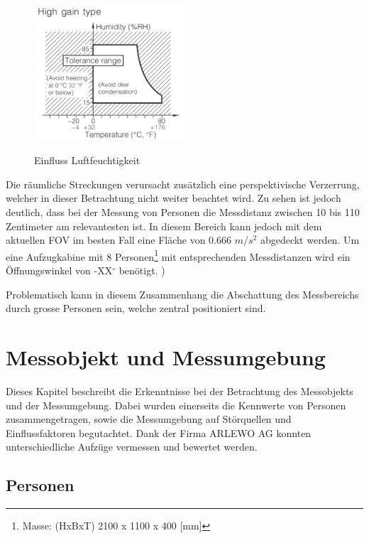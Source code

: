\begin{figure}[H]
	\centering
	\includegraphics[width=0.5\textwidth]
	{fig/Humidity_Tolerance.PNG}
	\caption[Einfluss Luftfeuchtigkeit]{Einfluss Luftfeuchtigkeit} \protect\cite{AMG8834}
	\label{fig:Geometrie}
\end{figure}

Die räumliche Streckungen verursacht zusätzlich eine perspektivische Verzerrung, welcher in dieser Betrachtung nicht weiter beachtet wird. Zu sehen ist jedoch deutlich, dass bei der Messung von Personen die Messdistanz zwischen 10 bis 110 Zentimeter am relevantesten ist. In diesem Bereich kann jedoch mit dem aktuellen \ac{FOV} im besten Fall eine Fläche von 0.666 $ m/s^2 $ abgedeckt werden. Um eine Aufzugkabine mit 8 Personen\footnote[1]{Masse: (HxBxT) 2100 x 1100 x 400 [mm]} mit entsprechenden Messdistanzen wird ein Öffnungswinkel von -XX$^\circ$ benötigt. 
)

Problematisch kann in diesem Zusammenhang die Abschattung des Messbereichs durch grosse Personen sein, welche zentral positioniert sind. 

 

\section{Messobjekt und Messumgebung}

Dieses Kapitel beschreibt die Erkenntnisse bei der Betrachtung des Messobjekts und der Messumgebung. Dabei wurden einerseits die Kennwerte von Personen zusammengetragen, sowie die Messumgebung auf Störquellen und Einflussfaktoren begutachtet. Dank der Firma ARLEWO AG konnten unterschiedliche Aufzüge vermessen und bewertet werden. 

\subsection{Personen}



